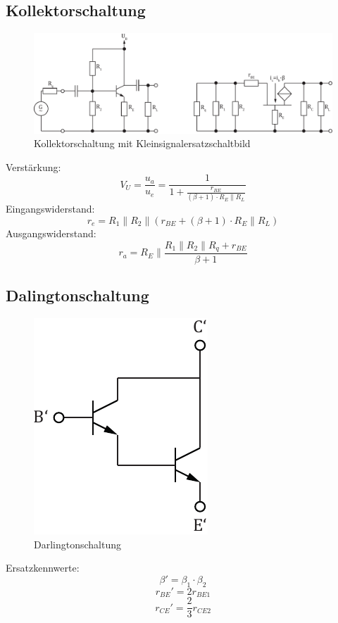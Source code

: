 \subsection{Kollektorschaltung}
\begin{figure}[h!]
	\centering
	\includegraphics[width = \linewidth]{trans_kollektor.pdf}
	\caption{Kollektorschaltung mit Kleinsignalersatzschaltbild}
	\label{trans:kollektroschaltung}
\end{figure}
\noindent
Verstärkung:
\[
	V_U = \frac{u_a}{u_e} = \frac{1}{1 + \frac{r_{BE}}{(\beta + 1) \cdot R_E \parallel R_L}}
\]
Eingangswiderstand:
\[
	r_e = R_1 \parallel R_2 \parallel (r_{BE} + (\beta+1) \cdot R_E \parallel R_L)
\]
Ausgangswiderstand:
\[
	r_a = R_E \parallel \frac{R_1 \parallel R_2 \parallel R_q + r_{BE}}{\beta + 1}
\]

\subsection{Dalingtonschaltung}
\begin{figure}[h!]
	\centering
	\includegraphics[scale = 0.6]{darlington.pdf}
	\caption{Darlingtonschaltung}
	\label{trans:darlington}
\end{figure}
\noindent
Ersatzkennwerte:
\[ \beta' = \beta_1 \cdot \beta_2 \]
\[ r_{BE}' = 2r_{BE1} \]
\[ r_{CE}' = \frac{2}{3} r_{CE2} \]

